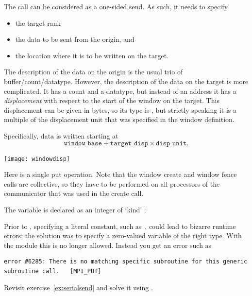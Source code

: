 The  call can be considered as a one-sided
send. As such, it needs to specify
\begin{itemize}
\item the target rank
\item the data to be sent from the origin, and
\item the location where it is to be written on the target.
\end{itemize}

The description of the data on the origin is the usual trio of
buffer/count/datatype. However, the description of the data on the
target is more complicated. It has a count and a datatype, but instead
of an address it has a
\emph{displacement} with respect to the
start of the window on the target. This displacement can be given in
bytes, so its type is , but strictly speaking
it is a multiple of the displacement unit that was specified in the
window definition.

Specifically, data is written starting at
\[ \mathtt{window\_base} + \mathtt{target\_disp}\times \mathtt{disp\_unit}. \]

\texttt{[image: windowdisp]}

Here is a single put operation. Note that the window create and window fence calls
are collective, so they have to be performed on all processors
of the communicator that was used in the create call.
%

\begin{fortrannote}
  The  variable is declared as an integer of `kind'
  :

Prior to ,
specifying a literal constant, such as~, could lead to bizarre
runtime errors; the solution was to specify a zero-valued variable
of the right type.
With the  module this
is no longer allowed. Instead you get an error such as
\begin{verbatim}
error #6285: There is no matching specific subroutine for this generic subroutine call.   [MPI_PUT]
\end{verbatim}
\end{fortrannote}

\begin{exercise}
  \label{ex:rightput}
  Revisit exercise~\ref{ex:serialsend} and solve it using
  .
\end{exercise}

